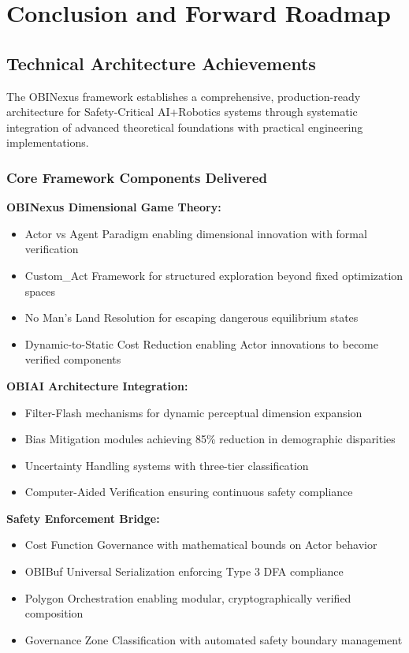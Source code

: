 \documentclass[12pt,a4paper]{article}
\begin{document}
\clearpage

\section{Conclusion and Forward Roadmap}

\subsection{Technical Architecture Achievements}

The OBINexus framework establishes a comprehensive, production-ready architecture for Safety-Critical AI+Robotics systems through systematic integration of advanced theoretical foundations with practical engineering implementations.

\subsubsection{Core Framework Components Delivered}

\textbf{OBINexus Dimensional Game Theory:}
\begin{itemize}
    \item Actor vs Agent Paradigm enabling dimensional innovation with formal verification
    \item Custom\_Act Framework for structured exploration beyond fixed optimization spaces
    \item No Man's Land Resolution for escaping dangerous equilibrium states
    \item Dynamic-to-Static Cost Reduction enabling Actor innovations to become verified components
\end{itemize}

\textbf{OBIAI Architecture Integration:}
\begin{itemize}
    \item Filter-Flash mechanisms for dynamic perceptual dimension expansion
    \item Bias Mitigation modules achieving 85\% reduction in demographic disparities
    \item Uncertainty Handling systems with three-tier classification
    \item Computer-Aided Verification ensuring continuous safety compliance
\end{itemize}

\textbf{Safety Enforcement Bridge:}
\begin{itemize}
    \item Cost Function Governance with mathematical bounds on Actor behavior
    \item OBIBuf Universal Serialization enforcing Type 3 DFA compliance
    \item Polygon Orchestration enabling modular, cryptographically verified composition
    \item Governance Zone Classification with automated safety boundary management
\end{itemize}
\end{document}
